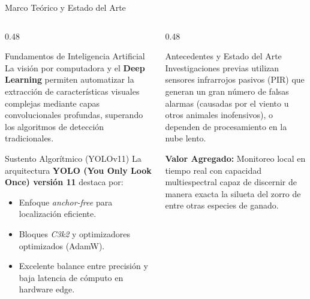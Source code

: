 \documentclass[10pt,aspectratio=169]{beamer}
\begin{document}
\begin{frame}{Marco Teórico y Estado del Arte}
  \begin{columns}[T]
    \begin{column}{0.48\textwidth}
      \begin{block}{Fundamentos de Inteligencia Artificial}
        \small
        La visión por computadora y el \textbf{Deep Learning} permiten automatizar la extracción de características visuales complejas mediante capas convolucionales profundas, superando los algoritmos de detección tradicionales.
      \end{block}
      \begin{block}{Sustento Algorítmico (YOLOv11)}
        \small
        La arquitectura \textbf{YOLO (You Only Look Once) versión 11} destaca por:
        \begin{itemize}
          \scriptsize
          \item Enfoque \textit{anchor-free} para localización eficiente.
          \item Bloques \textit{C3k2} y optimizadores optimizados (AdamW).
          \item Excelente balance entre precisión y baja latencia de cómputo en hardware edge.
        \end{itemize}
      \end{block}
    \end{column}
    
    \begin{column}{0.48\textwidth}
      \begin{block}{Antecedentes y Estado del Arte}
        \small
        Investigaciones previas utilizan sensores infrarrojos pasivos (PIR) que generan un gran número de falsas alarmas (causadas por el viento u otros animales inofensivos), o dependen de procesamiento en la nube lento.
        
        \vspace{0.2cm}
        \textbf{Valor Agregado:} Monitoreo local en tiempo real con capacidad multiespectral capaz de discernir de manera exacta la silueta del zorro de entre otras especies de ganado.
      \end{block}
    \end{column}
  \end{columns}
\end{frame}
\end{document}
